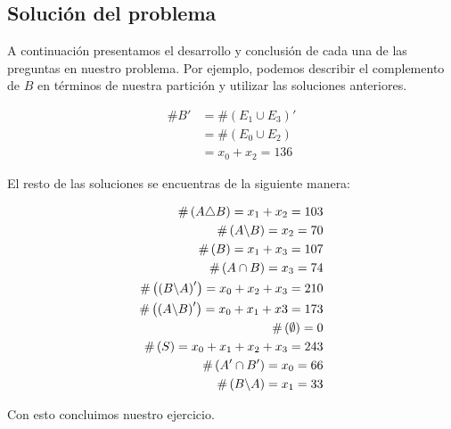 \subsection{Solución del problema}

A continuación presentamos el desarrollo y conclusión de cada una de las preguntas en nuestro problema. Por ejemplo, podemos describir el complemento de $ B $ en términos de nuestra partición y utilizar las soluciones anteriores. 

\begin{align*}
	\# B' 
	&= \#\left(E_1 \cup E_3\right)'\\
	&= \#\left(E_0 \cup E_2\right)\\
	&= x_0 + x_2 = 136
\end{align*}

El resto de las soluciones se encuentras de la siguiente manera:

\begin{align*}
	\#\left( A\triangle B \right) = x_1+x_2 = 103  \\
	\#\left( A\backslash B \right) = x_2 = 70 \\
	\#\left( B \right) = x_1+x_3=107	\\
	\#\left( A \cap B \right) = x_3 = 74 \\
	\#\left( \left(B\backslash A\right)' \right) 
	= x_0+x_2+x_3 = 210 \\
	\#\left( \left(A\backslash B\right)' \right)
	= x_0+x_1+x3 = 173 \\
	\#\left( \emptyset \right) = 0 \\
	\#\left( S \right) = x_0+x_1+x_2+x_3 = 243 \\
	\#\left( A' \cap B' \right) = x_0 = 66\\
	\#\left( B\backslash A \right) = x_1 = 33
\end{align*}

Con esto concluimos nuestro ejercicio. 